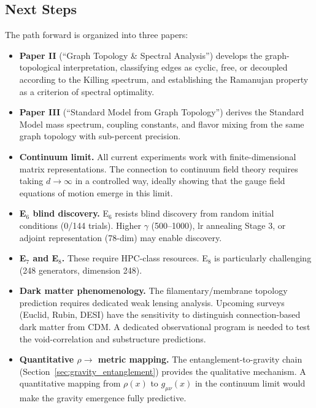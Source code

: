 \subsection{Next Steps}\label{sec:next_steps}

The path forward is organized into three papers:

\begin{itemize}
\item \textbf{Paper II} (``Graph Topology \& Spectral Analysis'') develops the graph-topological interpretation, classifying edges as cyclic, free, or decoupled according to the Killing spectrum, and establishing the Ramanujan property as a criterion of spectral optimality.

\item \textbf{Paper III} (``Standard Model from Graph Topology'') derives the Standard Model mass spectrum, coupling constants, and flavor mixing from the same graph topology with sub-percent precision.

\item \textbf{Continuum limit.} All current experiments work with finite-dimensional matrix representations. The connection to continuum field theory requires taking $d \to \infty$ in a controlled way, ideally showing that the gauge field equations of motion emerge in this limit.

\item \textbf{E$_6$ blind discovery.} E$_6$ resists blind discovery from random initial conditions (0/144 trials). Higher $\gamma$ (500--1000), lr annealing Stage 3, or adjoint representation (78-dim) may enable discovery.

\item \textbf{E$_7$ and E$_8$.} These require HPC-class resources. E$_8$ is particularly challenging (248 generators, dimension 248).

\item \textbf{Dark matter phenomenology.} The filamentary/membrane topology prediction requires dedicated weak lensing analysis. Upcoming surveys (Euclid, Rubin, DESI) have the sensitivity to distinguish connection-based dark matter from CDM. A dedicated observational program is needed to test the void-correlation and substructure predictions.

\item \textbf{Quantitative $\rho \to$ metric mapping.} The entanglement-to-gravity chain (Section~\ref{sec:gravity_entanglement}) provides the qualitative mechanism. A quantitative mapping from $\rho(x)$ to $g_{\mu\nu}(x)$ in the continuum limit would make the gravity emergence fully predictive.
\end{itemize}
